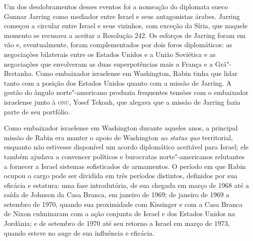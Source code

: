Um dos desdobramentos desses eventos foi a nomeação do diplomata sueco
Gunnar Jarring como mediador entre Israel e seus antagonistas árabes.
Jarring começou a circular entre Israel e seus vizinhos, com exceção da
Síria, que naquele momento se recusava a aceitar a Resolução 242. Os
esforços de Jarring foram em vão e, eventualmente, foram complementados
por dois foros diplomáticos: as negociações bilaterais entre os Estados
Unidos e a União Soviética e as negociações que envolveram as duas
superpotências mais a França e a Grã"-Bretanha. Como embaixador
israelense em Washington, Rabin tinha que lidar tanto com a posição dos
Estados Unidos quanto com a missão de Jarring. A gestão do ângulo norte"-americano
produzia frequentes tensões com o embaixador israelense junto à \textsc{onu},
Yosef Tekoah, que alegava que a missão de Jarring fazia parte de seu
portfólio.


Como embaixador israelense em Washington durante aqueles anos, a
principal missão de Rabin era manter o apoio de Washington ao
\textit{status quo} territorial, enquanto não estivesse disponível um
acordo diplomático aceitável para Israel; ele também ajudava a convencer
políticos e burocratas norte"-americanos relutantes a fornecer a Israel
sistemas sofisticados de armamentos. O período em que Rabin ocupou o cargo pode ser
dividida em três períodos distintos, definidos por sua eficácia e
estatura: uma fase introdutória, de sua chegada em março de 1968 até a
saída de Johnson da Casa Branca, em janeiro de 1969; de janeiro de 1969 a
setembro de 1970, quando sua proximidade com Kissinger e com a Casa
Branca de Nixon culminaram com a ação conjunta de Israel e dos Estados Unidos na
Jordânia; e de setembro de 1970 até seu retorno a Israel em março de
1973, quando esteve no auge de sua influência e eficácia.

